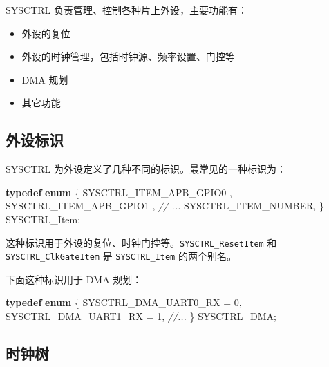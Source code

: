 \documentclass[
  12pt,
]{book}
\newenvironment{Shaded}{\begin{snugshade}}{\end{snugshade}}
\newcommand{\CommentTok}[1]{\textcolor[rgb]{0.56,0.35,0.01}{\textit{#1}}}
\newcommand{\DecValTok}[1]{\textcolor[rgb]{0.00,0.00,0.81}{#1}}
\newcommand{\KeywordTok}[1]{\textcolor[rgb]{0.13,0.29,0.53}{\textbf{#1}}}
\newcommand{\NormalTok}[1]{#1}
\providecommand{\tightlist}{%
  \setlength{\itemsep}{0pt}\setlength{\parskip}{0pt}}
\begin{document}
SYSCTRL 负责管理、控制各种片上外设，主要功能有：

\begin{itemize}
\tightlist
\item
  外设的复位
\item
  外设的时钟管理，包括时钟源、频率设置、门控等
\item
  DMA 规划
\item
  其它功能
\end{itemize}

\hypertarget{ux5916ux8bbeux6807ux8bc6}{%
\subsection{外设标识}\label{ux5916ux8bbeux6807ux8bc6}}

SYSCTRL 为外设定义了几种不同的标识。最常见的一种标识为：

\begin{Shaded}
\begin{Highlighting}[]
\KeywordTok{typedef} \KeywordTok{enum}
\NormalTok{\{}
\NormalTok{    SYSCTRL_ITEM_APB_GPIO0     ,}
\NormalTok{    SYSCTRL_ITEM_APB_GPIO1     ,}
    \CommentTok{// ...}
\NormalTok{    SYSCTRL_ITEM_NUMBER,}
\NormalTok{\} SYSCTRL_Item;}
\end{Highlighting}
\end{Shaded}

这种标识用于外设的复位、时钟门控等。\texttt{SYSCTRL\_ResetItem} 和 \texttt{SYSCTRL\_ClkGateItem} 是
\texttt{SYSCTRL\_Item} 的两个别名。

下面这种标识用于 DMA 规划：

\begin{Shaded}
\begin{Highlighting}[]
\KeywordTok{typedef} \KeywordTok{enum}
\NormalTok{\{}
\NormalTok{    SYSCTRL_DMA_UART0_RX = }\DecValTok{0}\NormalTok{,}
\NormalTok{    SYSCTRL_DMA_UART1_RX = }\DecValTok{1}\NormalTok{,}
    \CommentTok{//...}
\NormalTok{\} SYSCTRL_DMA;}
\end{Highlighting}
\end{Shaded}

\hypertarget{ux65f6ux949fux6811}{%
\subsection{时钟树}\label{ux65f6ux949fux6811}}
\end{document}

